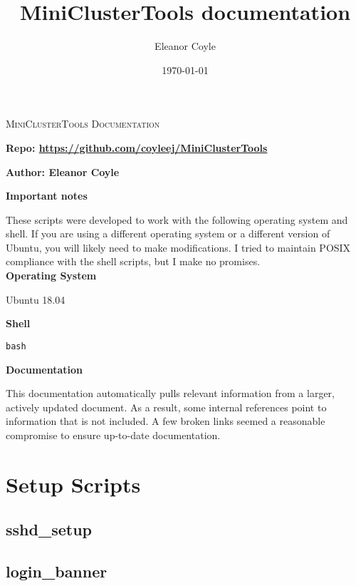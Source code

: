 \documentclass[10pt,letterpaper]{report}
\title{MiniClusterTools documentation}
\author{Eleanor Coyle}
\date{\today}
\begin{document}
\begin{titlepage}
	\centering
	\vfill
	{\huge\scshape MiniClusterTools Documentation\par}

	\vspace{3cm}
	\textbf{Repo: \href{https://github.com/coyleej/MiniClusterTools}{https://github.com/coyleej/MiniClusterTools}}

	\vspace{0.5cm}
	\textbf{Author: Eleanor Coyle}

	\vspace{3cm}
	\textbf{Important notes} \par

	These scripts were developed to work with the following operating system and shell. If you are using a different operating system or a different version of Ubuntu, you will likely need to make modifications. I tried to maintain POSIX compliance with the shell scripts, but I make no promises. \\
	
	\vspace{1cm}
	\textbf{Operating System} \par
	Ubuntu 18.04

	\vspace{1cm}
	\textbf{Shell} \par
	\texttt{bash}	

	\vspace{1cm}
	\textbf{Documentation} \par
	This documentation automatically pulls relevant information from a larger, actively updated document. 
	As a result, some internal references point to information that is not included. 
	A few broken links seemed a reasonable compromise to ensure up-to-date documentation.

\end{titlepage}

\tableofcontents

\chapter{Setup Scripts}			\label{ch:setup}

\section{sshd\_setup}			\label{sec:openssh}
	

\section{login\_banner}			\label{sec:login}
	
\end{document}
